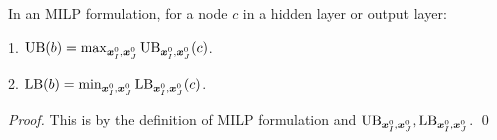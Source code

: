 				\begin{lemma} In an MILP formulation, for a node $c$ in a hidden layer or output layer:
					
					1. $\mathrm{UB}(b)=\max_{\boldsymbol{x}^0_I,\boldsymbol{x}^0_J}\mathrm{UB}_{\boldsymbol{x}^0_I,\boldsymbol{x}^0_J}(c)$. 
					
					2. $\mathrm{LB}(b)=\min_{\boldsymbol{x}^0_I,\boldsymbol{x}^0_J}\mathrm{LB}_{\boldsymbol{x}^0_I,\boldsymbol{x}^0_J}(c)$. 
				\end{lemma}
				
				\begin{proof}
					This is by the definition of MILP formulation and $\mathrm{UB}_{\boldsymbol{x}^0_I,\boldsymbol{x}^0_J}, \mathrm{LB}_{\boldsymbol{x}^0_I,\boldsymbol{x}^0_J}$. \qed
				\end{proof}
				
				
